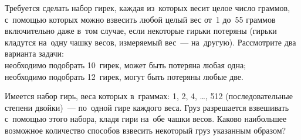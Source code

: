 \begin{problems}
\item
Требуется сделать набор гирек, каждая из~которых весит целое число граммов,
с~помощью которых можно взвесить любой целый вес от~1 до~55 граммов
включительно даже в~том случае, если некоторые гирьки потеряны
(гирьки кладутся на~одну чашку весов, измеряемый вес~--- на~другую).
Рассмотрите два варианта задачи:
\\
\sbp необходимо подобрать 10~гирек, может быть потеряна любая одна;
\\
\sbp необходимо подобрать 12~гирек, могут быть потеряны любые две.
  
\item
Имеется набор гирь, веса которых в~граммах: 1, 2, 4, \ldots, 512
(последовательные степени двойки)~--- по~одной гире каждого веса.
Груз разрешается взвешивать с~помощью этого набора, кладя гири на~обе чашки
весов.
Каково наибольшее возможное количество способов взвесить некоторый груз
указанным образом?

\end{problems}

